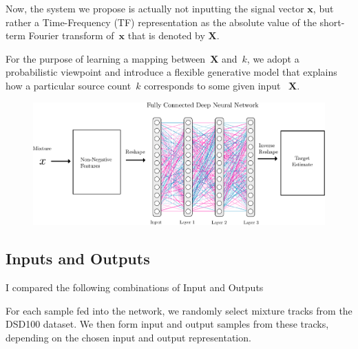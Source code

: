 Now, the system we propose is actually not inputting the signal vector $\mathbf{x}$, but rather a Time-Frequency (TF) representation as the absolute value of the short-term Fourier transform of~$\mathbf{x}$ that is denoted by $\mathbf{X}$.

For the purpose of learning a mapping between~$\mathbf{X}$ and~$k$, we adopt a probabilistic viewpoint and introduce a flexible generative model that explains how a particular source count~$k$ corresponds to some given input ~$\mathbf{X}$.

\begin{figure}[ht!]
\centering
		\includegraphics[width=\textwidth]{Chapters/06_Separation_Unknown/figures/uhlich_dnn.pdf}
\caption{}
\label{fig:cft_dnn}
\end{figure}

\subsection{Inputs and Outputs}

I compared the following combinations of Input and Outputs

For each sample fed into the network, we randomly select mixture tracks from the DSD100 dataset.
We then form input and output samples from these tracks, depending on the chosen input and output representation.


